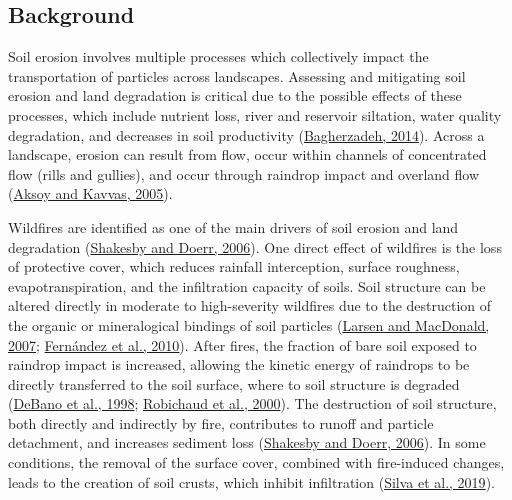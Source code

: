 \documentclass[
]{article}
\begin{document}
\hypertarget{background}{%
\subsection*{Background}\label{background}}

Soil erosion involves multiple processes which collectively impact the transportation of particles across landscapes. Assessing and mitigating soil erosion and land degradation is critical due to the possible effects of these processes, which include nutrient loss, river and reservoir siltation, water quality degradation, and decreases in soil productivity (\href{https://www.researchgate.net/publication/257785877_Estimation_of_soil_losses_by_USLE_model_using_GIS_at_Mashhad_plain_Northeast_of_Iran}{Bagherzadeh, 2014}). Across a landscape, erosion can result from flow, occur within channels of concentrated flow (rills and gullies), and occur through raindrop impact and overland flow (\href{https://www.researchgate.net/publication/223520981_A_review_of_hillslope_and_watershed_scale_erosion_and_sediment_transport_models}{Aksoy and Kavvas, 2005}).

Wildfires are identified as one of the main drivers of soil erosion and land degradation (\href{https://www.sciencedirect.com/science/article/pii/S0012825205001467}{Shakesby and Doerr, 2006}). One direct effect of wildfires is the loss of protective cover, which reduces rainfall interception, surface roughness, evapotranspiration, and the infiltration capacity of soils. Soil structure can be altered directly in moderate to high-severity wildfires due to the destruction of the organic or mineralogical bindings of soil particles (\href{https://acsess.onlinelibrary.wiley.com/doi/abs/10.2136/sssaj2007.0432}{Larsen and MacDonald, 2007}; \href{https://www.researchgate.net/publication/284913901_Modelling_the_Effect_of_Soil_Burn_Severity_on_Soil_Erosion_at_Hillslope_Scale_in_the_First_Year_Following_Wildfire_in_nw_Spain}{Fernández et al., 2010}). After fires, the fraction of bare soil exposed to raindrop impact is increased, allowing the kinetic energy of raindrops to be directly transferred to the soil surface, where to soil structure is degraded (\href{http://www.fsl.orst.edu/ltep/Biscuit/Biscuit_files/Refs/DeBano\%20JH2000b\%20fire.pdf}{DeBano et al., 1998}; \href{https://www.researchgate.net/publication/222698132_Fire_Effects_on_Infiltration_Rates_After_Prescribed_Fire_in_Northern_Rocky_Mountain_Forests_USA}{Robichaud et al., 2000}). The destruction of soil structure, both directly and indirectly by fire, contributes to runoff and particle detachment, and increases sediment loss (\href{https://www.sciencedirect.com/science/article/pii/S0012825205001467}{Shakesby and Doerr, 2006}). In some conditions, the removal of the surface cover, combined with fire-induced changes, leads to the creation of soil crusts, which inhibit infiltration (\href{https://www.sciencedirect.com/science/article/pii/S0925857418304713}{Silva et al., 2019}).
\end{document}
